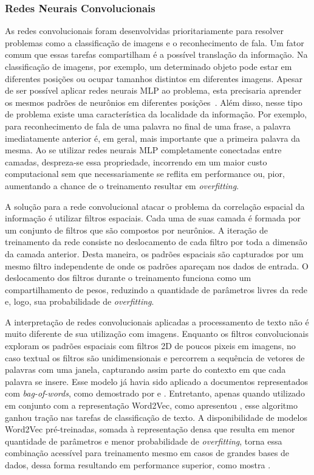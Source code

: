 
\subsubsection{Redes Neurais Convolucionais}

As redes convolucionais foram desenvolvidas prioritariamente para resolver
problemas como a classificação de imagens e o reconhecimento de fala.
Um fator comum que essas tarefas compartilham é a possível translação da
informação.
Na classificação de imagens, por exemplo, um determinado objeto pode estar em
diferentes posições ou ocupar tamanhos distintos em diferentes imagens.
Apesar de ser possível aplicar redes neurais MLP ao problema, esta precisaria
aprender os mesmos padrões de neurônios em diferentes posições~\cite{lecun95}.
Além disso, nesse tipo de problema existe uma característica da localidade da
informação.
Por exemplo, para reconhecimento de fala de uma palavra no final de uma frase,
a palavra imediatamente anterior é, em geral, mais importante que a primeira
palavra da mesma.
Ao se utilizar redes neurais MLP completamente conectadas entre camadas,
despreza-se essa propriedade, incorrendo em um maior custo computacional sem que
necessariamente se reflita em performance ou, pior, aumentando a chance de o
treinamento resultar em \textit{overfitting}.

A solução para a rede convolucional atacar o problema da correlação espacial da
informação é utilizar filtros espaciais.
Cada uma de suas camada é formada por um conjunto de filtros que são
compostos por neurônios.
A iteração de treinamento da rede consiste no deslocamento de cada filtro por
toda a dimensão da camada anterior.
Desta maneira, os padrões espaciais são capturados por um mesmo filtro
independente de onde os padrões apareçam nos dados de entrada.
O deslocamento dos filtros durante o treinamento funciona como um
compartilhamento de pesos, reduzindo a quantidade de parâmetros livres da rede
e, logo, sua probabilidade de \textit{overfitting}.

A interpretação de redes convolucionais aplicadas a processamento de texto não é
muito diferente de sua utilização com imagens.
Enquanto os filtros convolucionais exploram os padrões espaciais com filtros 2D de
poucos pixeis em imagens, no caso textual os filtros são unidimensionais e
percorrem a sequência de vetores de palavras com uma janela, capturando assim
parte do contexto em que cada palavra se insere.
Esse modelo já havia sido aplicado a documentos representados com
\textit{bag-of-words}, como demostrado por \citet{kalchbrenner14} e
\citet{yih14}.
Entretanto, apenas quando utilizado em conjunto com a representação
Word2Vec, como apresentou \citet{kim14}, esse algoritmo ganhou tração nas
tarefas de classificação de texto.
A disponibilidade de modelos Word2Vec pré-treinadas, somada à representação
densa que resulta em menor quantidade de parâmetros e menor probabilidade de
\textit{overfitting}, torna essa combinação acessível para treinamento mesmo em
casos de grandes bases de dados, dessa forma resultando em performance superior,
como mostra \citet{kim14}.

